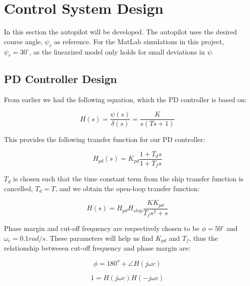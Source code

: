 \newpage
\section{Control System Design}

In this section the autopilot will be developed. The autopilot uses the desired course angle, $\psi_r$ as reference. For the MatLab simulations in this project, $\psi_r = 30^\circ$, as the linearized model only holds for small deviations in $\psi$. 


\subsection{PD Controller Design}

From earlier we had the following equation, which the PD controller is based on:

\begin{equation*}
    H(s) = \frac{{\psi (s)}}{{\delta (s)}} = \frac{K}{{s(Ts + 1)}}
\end{equation*}

This provides the following transfer function for our PD controller:

\begin{equation}
    H_{pd}(s) = K_{pd}\frac{1+T_{d}s}{1+T_{f}s}
\end{equation}

$T_{d}$ is chosen such that the time constant term from the ship transfer function is cancelled, $T_{d} = T$, and we obtain the open-loop transfer function:

\begin{equation}
    H(s) = H_{pd}H_{ship}\frac{K K_{pd}}{T_{f}s^2+s}
\end{equation}

Phase margin and cut-off frequency are respectively chosen to be $\phi = 50^\circ$ and $\omega_{c} = 0.1 rad/s$. These parameters will help us find $K_{pd}$ and $T_{f}$, thus the relationship betweeen cut-off frequency and phase margin are:

\begin{equation}\label{phi}
    \phi  = {180^o} + \angle H(j\omega c)
\end{equation}

\begin{equation}\label{relat}
    1 = H(j\omega c)H( - j\omega c)
\end{equation}

